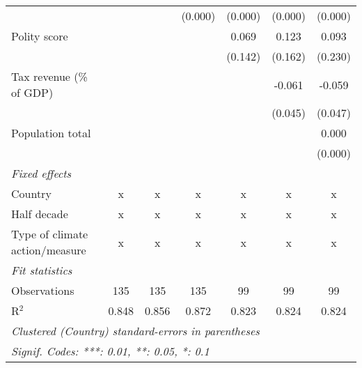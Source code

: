\begin{tabular}{lcccccc}
                                                                                        &               &               & (0.000)        & (0.000)        & (0.000)        & (0.000)\\   
   Polity score                                                                         &               &               &                & 0.069          & 0.123          & 0.093\\   
                                                                                        &               &               &                & (0.142)        & (0.162)        & (0.230)\\   
   Tax revenue (\% of GDP)                                                              &               &               &                &                & -0.061         & -0.059\\   
                                                                                        &               &               &                &                & (0.045)        & (0.047)\\   
   Population total                                                                     &               &               &                &                &                & 0.000\\   
                                                                                        &               &               &                &                &                & (0.000)\\   
   \emph{Fixed effects}\\
   Country                                                                              & x             & x             & x              & x              & x              & x\\  
   Half decade                                                                          & x             & x             & x              & x              & x              & x\\  
   Type of climate action/measure                                                       & x             & x             & x              & x              & x              & x\\  
   \midrule \emph{Fit statistics}\\
   Observations                                                                         & 135           & 135           & 135            & 99             & 99             & 99\\  
   R$^2$                                                                                & 0.848         & 0.856         & 0.872          & 0.823          & 0.824          & 0.824\\  
   \midrule
   \multicolumn{7}{l}{\emph{Clustered (Country) standard-errors in parentheses}}\\
   \multicolumn{7}{l}{\emph{Signif. Codes: ***: 0.01, **: 0.05, *: 0.1}}\\
\end{tabular}
\par\endgroup



